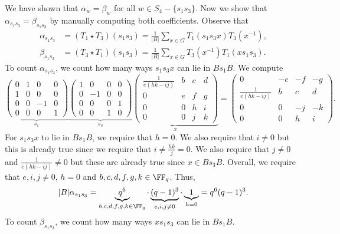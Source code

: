 \documentclass[11pt]{amsart}
\theoremstyle{remark}
\begin{document}
We have shown that $\alpha_w=\beta_w$ for all $w\in S_4-\{s_1s_3\}$.
Now we show that $\alpha_{s_1s_3}=\beta_{s_1s_3}$ by manually computing both coefficients.
Observe that
\begin{align*}
	\alpha_{s_1s_3} & = (T_1\star T_3)(s_1s_3) = \frac{1}{|B|}\sum_{x\in G} T_1(s_1s_3x)T_3(x^{-1}), \\
	\beta_{s_1s_3}  & = (T_3\star T_1)(s_1s_3) = \frac{1}{|B|}\sum_{x\in G} T_3(x^{-1})T_1(xs_1s_3).
\end{align*}
To count $\alpha_{s_1s_3}$, we count how many ways $s_1s_3x$ can lie in $Bs_1B$.
We compute
\[
	\underbrace{
		\begin{pmatrix}
			0 & 1 & 0  & 0 \\
			1 & 0 & 0  & 0 \\
			0 & 0 & -1 & 0 \\
			0 & 0 & 0  & 1
		\end{pmatrix}}_{s_1}
	\underbrace{\begin{pmatrix}
			1 & 0  & 0 & 0 \\
			0 & -1 & 0 & 0 \\
			0 & 0  & 0 & 1 \\
			0 & 0  & 1 & 0
		\end{pmatrix}}_{s_3}
	\underbrace{\begin{pmatrix}
			\frac{1}{e(hk-ij)} & b & c & d \\
			0                  & e & f & g \\
			0                  & 0 & h & i \\
			0                  & 0 & j & k
		\end{pmatrix}}_{x} =
	\begin{pmatrix}
		0                  & -e & -f & -g \\
		\frac{1}{e(hk-ij)} & b  & c  & d  \\
		0                  & 0  & -j & -k \\
		0                  & 0  & h  & i
	\end{pmatrix}.
\]
For $s_1s_3x$ to lie in $Bs_1B$, we require that $h=0$.
We also require that $i\neq 0$ but this is already true since we require that $i\neq \frac{hk}{j}=0$.
We also require that $j\neq 0$ and $\frac{1}{e(hk-ij)}\neq 0$ but these are already true since $x\in Bs_3B$.
Overall, we require that $e,i,j\neq 0$, $h=0$ and $b,c,d,f,g,k\in\FF_q$.
Thus,
\[
	|B|\alpha_{s_1s_3} = \underbrace{q^6}_{b,c,d,f,g,k\in\FF_q}\cdot\underbrace{(q-1)^3}_{e,i,j\neq 0} \cdot \underbrace{1}_{h=0} = q^6(q-1)^3.
\]
To count $\beta_{s_1s_3}$, we count how many ways $xs_1s_3$ can lie in $Bs_1B$.
\end{document}
